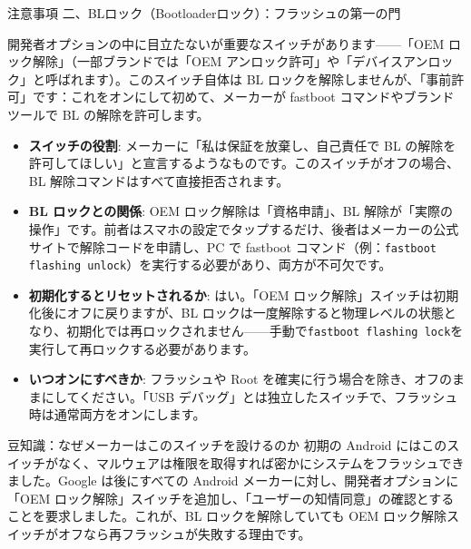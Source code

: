 \begin{tcbwarn}{注意事項}
二、BLロック（Bootloaderロック）：フラッシュの第一の門

\end{tcbwarn}


開発者オプションの中に目立たないが重要なスイッチがあります——「OEM ロック解除」（一部ブランドでは「OEM アンロック許可」や「デバイスアンロック」と呼ばれます）。このスイッチ自体は BL ロックを解除しませんが、「事前許可」です：これをオンにして初めて、メーカーが fastboot コマンドやブランドツールで BL の解除を許可します。

\begin{itemize}
  \item \textbf{スイッチの役割}: メーカーに「私は保証を放棄し、自己責任で BL の解除を許可してほしい」と宣言するようなものです。このスイッチがオフの場合、BL 解除コマンドはすべて直接拒否されます。
  \item \textbf{BL ロックとの関係}: OEM ロック解除は「資格申請」、BL 解除が「実際の操作」です。前者はスマホの設定でタップするだけ、後者はメーカーの公式サイトで解除コードを申請し、PC で fastboot コマンド（例：\texttt{fastboot flashing unlock}）を実行する必要があり、両方が不可欠です。
  \item \textbf{初期化するとリセットされるか}: はい。「OEM ロック解除」スイッチは初期化後にオフに戻りますが、BL ロックは一度解除すると物理レベルの状態となり、初期化では再ロックされません——手動で\texttt{fastboot flashing lock}を実行して再ロックする必要があります。
  \item \textbf{いつオンにすべきか}: フラッシュや Root を確実に行う場合を除き、オフのままにしてください。「USB デバッグ」とは独立したスイッチで、フラッシュ時は通常両方をオンにします。
\end{itemize}

\begin{tcbinfo}{豆知識：なぜメーカーはこのスイッチを設けるのか}
初期の Android にはこのスイッチがなく、マルウェアは権限を取得すれば密かにシステムをフラッシュできました。Google は後にすべての Android メーカーに対し、開発者オプションに「OEM ロック解除」スイッチを追加し、「ユーザーの知情同意」の確認とすることを要求しました。これが、BL ロックを解除していても OEM ロック解除スイッチがオフなら再フラッシュが失敗する理由です。

\end{tcbinfo}


